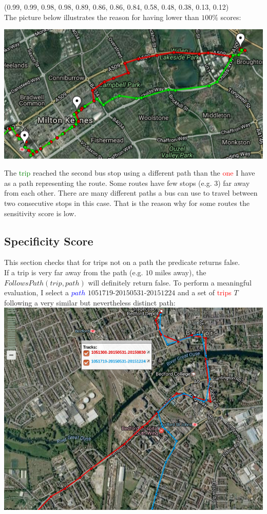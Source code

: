 \documentclass[12pt,a4paper,oneside,openright]{report}
\begin{document}
(0.99, 0.99, 0.98, 0.98, 0.89, 0.86, 0.86, 0.84, 0.58, 0.48, 0.38, 0.13, 0.12) \\

The picture below illustrates the reason for having lower than $100\%$ scores:

\includegraphics[width=\textwidth]{figs/same_route_wrong_path.png}

The \textcolor{green}{trip} reached the second bus stop using a different path
than the \textcolor{red}{one} I have as a path representing the route.
Some routes have few stops (e.g. 3) far away from each other.
There are many different paths a bus can use to travel
between two consecutive stops in this case. That is the reason why for some routes the
sensitivity score is low.

\subsection{Specificity Score}

This section checks that for trips not on a path the predicate returns false. \\

If a trip is very far away from the path (e.g. $10$ miles away), the
$FollowsPath(trip, path)$ will definitely return false. To perform
a meaningful evaluation, I select a \textcolor{blue}{$path$}
$1051719$-$20150531$-$20151224$ and a set of \textcolor{red}{trips}
$T$ following a very similar but nevertheless distinct path: \\

\includegraphics[scale = 0.6]{figs/similar_paths.png}
\end{document}
